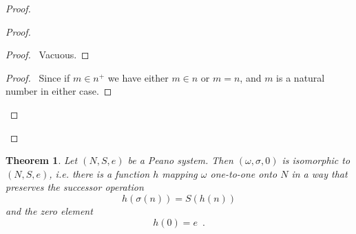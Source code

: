 \documentclass{report}
\let\qed\relax
\newtheorem{theorem}[axiom]{Theorem}
\theoremstyle{definition}
\begin{document}
    \begin{proof}
        \pf
        \begin{proof}
            \begin{proof}
                \pf\ Vacuous.
            \end{proof}
            \begin{proof}
                \pf\ Since if $m \in n^+$ we have either $m \in n$ or $m = n$, and $m$ is a natural number
                in either case.
            \end{proof}
        \end{proof}
        \qed
    \end{proof}

    \begin{theorem}
        Let $(N,S,e)$ be a Peano system. Then $(\omega, \sigma, 0)$ is isomorphic to $(N,S,e)$, i.e. there is
        a function $h$ mapping $\omega$ one-to-one onto $N$ in a way that preserves the successor operation
        \[ h(\sigma(n)) = S(h(n)) \]
        and the zero element
        \[ h(0) = e \enspace . \]
    \end{theorem}
\end{document}
